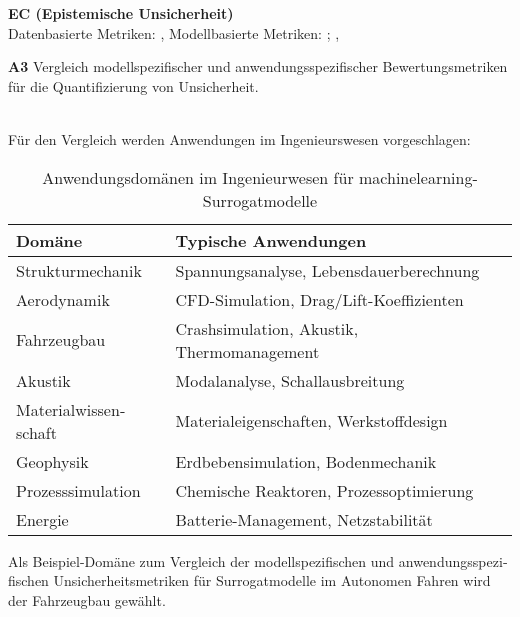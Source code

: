 \begin{otherlanguage}{ngerman}
{\begin{minipage}[t]{\textwidth}
\textbf{EC (Epistemische Unsicherheit)}\\
\quad Datenbasierte Metriken: \parencite[S.~30–32]{bishop2006pattern}, 
\quad Modellbasierte Metriken: \parencite[S.~40–42]{gal2016uncertainty}; \parencite{sensoy2018evidential}, 
\end{minipage}%
}


\pagebreak


\textbf{A3} Vergleich modellspezifischer und anwendungsspezifischer Bewertungsmetriken für die Quantifizierung von Unsicherheit.
\par\noindent\\
Für den Vergleich werden Anwendungen im Ingenieurswesen vorgeschlagen: 

\begin{table}[!htbp]
\scriptsize
\begin{tabularx}{\textwidth}{|l|X|}
\hline
\textbf{Domäne} & \textbf{Typische Anwendungen} \\
\hline
Strukturmechanik & Spannungsanalyse, Lebensdauerberechnung \\
\hline
Aerodynamik & CFD-Simulation, Drag/Lift-Koeffizienten \\
\hline
Fahrzeugbau & Crashsimulation, Akustik, Thermomanagement \\
\hline
Akustik & Modalanalyse, Schallausbreitung \\
\hline
Materialwissenschaft & Materialeigenschaften, Werkstoffdesign \\
\hline
Geophysik & Erdbebensimulation, Bodenmechanik \\
\hline
Prozesssimulation & Chemische Reaktoren, Prozessoptimierung \\
\hline
Energie & Batterie-Management, Netzstabilität \\
\hline
\end{tabularx}
\caption{Anwendungsdomänen im Ingenieurwesen für \gls{machinelearning}-Surrogatmodelle}
\label{tab:ingenieurwesen-domains-small}
\end{table}

Als Beispiel-Domäne zum Vergleich der modellspezifischen und anwendungsspezifischen Unsicherheitsmetriken für Surrogatmodelle im Autonomen Fahren wird der Fahrzeugbau gewählt. 


\end{otherlanguage}
